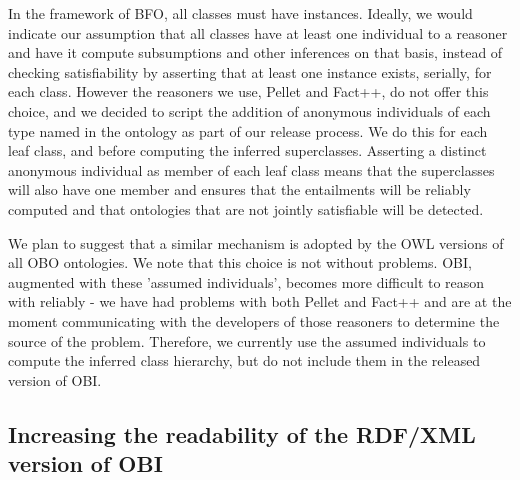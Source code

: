 \documentclass{elsart}       %
\begin{document}
In the framework of BFO, all classes must have instances.
Ideally, we would indicate our assumption that all classes have at least one individual to a reasoner and have it compute subsumptions and other inferences on that basis, instead of checking satisfiability by asserting that at least one instance exists, serially, for each class.
However the reasoners we use, Pellet\cite{pellet} and Fact++\cite{fact}, do not offer this choice, and we decided to script the addition of anonymous individuals of each type named in the ontology as part of our release process.
We do this for each leaf class, and before computing the inferred superclasses.
Asserting a distinct anonymous individual as member of each leaf class means that the superclasses will also have one member and ensures that the entailments will be reliably computed and that ontologies that are not jointly satisfiable will be detected.

We plan to suggest that a similar mechanism is adopted by the OWL versions of all OBO ontologies.
We note that this choice is not without problems.
OBI, augmented with these 'assumed individuals', becomes more difficult to reason with reliably - we have had problems with both Pellet and Fact++ and are at the moment communicating with the developers of those reasoners to determine the source of the problem. %
Therefore, we currently use the assumed individuals to compute the inferred class hierarchy, but do not include them in the released version of OBI.

\subsection{Increasing the readability of the RDF/XML version of OBI}
\end{document}
